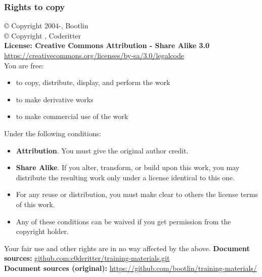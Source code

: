 \ifdefempty{\trainer}{}{
  
}

\begin{frame}
\frametitle{Rights to copy}
   \scriptsize
   © Copyright 2004-\the\year, Bootlin \\
   © Copyright      \the\year, Coderitter \\
   {\bf License: Creative Commons Attribution - Share Alike 3.0} \\
   \url{https://creativecommons.org/licenses/by-sa/3.0/legalcode} \\

   You are free:
   \begin{itemize}
     \item to copy, distribute, display, and perform the work
     \item to make derivative works
     \item to make commercial use of the work
   \end{itemize}

   Under the following conditions:
   \begin{itemize}
     \item {\bf Attribution}. You must give the original author credit.
     \item {\bf Share Alike}. If you alter, transform, or build upon
           this work, you may distribute the resulting work only under
           a license identical to this one.
     \item For any reuse or distribution, you must make clear to others
           the license terms of this work.
     \item Any of these conditions can be waived if you get permission
           from the copyright holder.
    \end{itemize}

    Your fair use and other rights are in no way affected by the above.
    \vfill
    {\bf Document sources:}
    \url{github.com:c0deritter/training-materials.git} \\
    {\bf Document sources (original):}
    \url{https://github.com/bootlin/training-materials/} \\
\end{frame}


